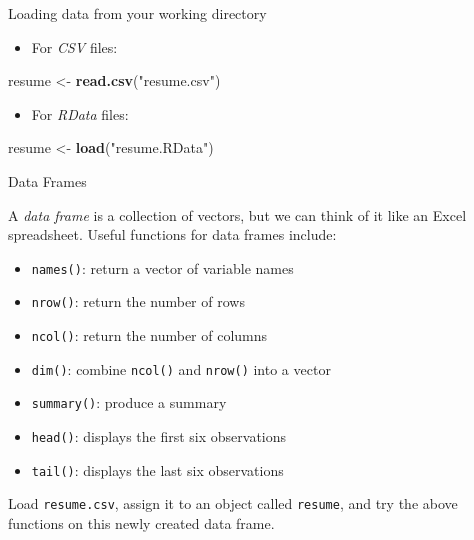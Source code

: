 \documentclass[ignorenonframetext,]{beamer}
\newenvironment{Shaded}{\begin{snugshade}}{\end{snugshade}}
\newcommand{\KeywordTok}[1]{\textcolor[rgb]{0.13,0.29,0.53}{\textbf{#1}}}
\newcommand{\StringTok}[1]{\textcolor[rgb]{0.31,0.60,0.02}{#1}}
\newcommand{\NormalTok}[1]{#1}
\providecommand{\tightlist}{%
	\setlength{\itemsep}{0pt}\setlength{\parskip}{0pt}}
\begin{document}
\begin{frame}[fragile]{Loading data from your working directory}

\begin{itemize}
\tightlist
\item
  For \emph{CSV} files:
\end{itemize}

\begin{Shaded}
\begin{Highlighting}[]
\NormalTok{resume <-}\StringTok{ }\KeywordTok{read.csv}\NormalTok{(}\StringTok{"resume.csv"}\NormalTok{)}
\end{Highlighting}
\end{Shaded}

\begin{itemize}
\tightlist
\item
  For \emph{RData} files:
\end{itemize}

\begin{Shaded}
\begin{Highlighting}[]
\NormalTok{resume <-}\StringTok{ }\KeywordTok{load}\NormalTok{(}\StringTok{"resume.RData"}\NormalTok{)}
\end{Highlighting}
\end{Shaded}

\end{frame}

\begin{frame}[fragile]{Data Frames}

A \emph{data frame} is a collection of vectors, but we can think of it
like an Excel spreadsheet. Useful functions for data frames include:

\begin{itemize}
\tightlist
\item
  \texttt{names()}: return a vector of variable names
\item
  \texttt{nrow()}: return the number of rows
\item
  \texttt{ncol()}: return the number of columns
\item
  \texttt{dim()}: combine \texttt{ncol()} and \texttt{nrow()} into a
  vector
\item
  \texttt{summary()}: produce a summary
\item
  \texttt{head()}: displays the first six observations
\item
  \texttt{tail()}: displays the last six observations
\end{itemize}

Load \texttt{resume.csv}, assign it to an object called \texttt{resume},
and try the above functions on this newly created data frame.

\end{frame}
\end{document}
